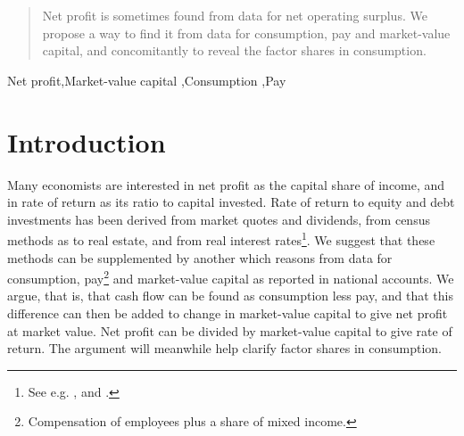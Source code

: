 \documentclass[a4paper,fleqn]{cas-sc}
\begin{document}
\begin{abstract}
Net profit is sometimes found from data for net operating surplus.  We propose a way to find it from data for consumption, pay and market-value capital, and concomitantly to reveal the factor shares in consumption.
\\
\end{abstract}



\begin{keywords}
Net profit\sep Market-value capital \sep Consumption \sep Pay
\end{keywords}

\maketitle

\section{Introduction}

Many economists are interested in net profit as the capital share of income, and in rate of return as its ratio to capital invested. 
%
Rate of return to equity and debt investments has been derived from market quotes and dividends, from census methods as to real estate, and from real interest rates\footnote{See e.g. \cite{jorda2019}, and \cite{homer2005history}.}. We suggest that these methods can be supplemented by another which reasons from data for consumption, pay\footnote{Compensation of employees plus a share of mixed income.} and market-value capital as reported in national accounts. We argue, that is,
%
that cash flow can be found as consumption less pay, and that this difference can then be added to change in market-value capital to give net profit at market value. Net profit can be divided by market-value capital to give rate of return. The argument will meanwhile help clarify factor shares in consumption.
\end{document}
